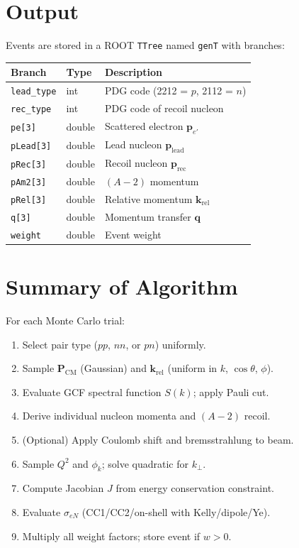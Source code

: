 \documentclass[11pt,a4paper]{article}
\newcommand{\vect}[1]{\bm{#1}}
\begin{document}
\section{Output}

Events are stored in a ROOT \texttt{TTree} named \texttt{genT} with branches:
\begin{center}
\begin{tabular}{lll}
\toprule
Branch & Type & Description \\
\midrule
\texttt{lead\_type} & int & PDG code (2212 = $p$, 2112 = $n$) \\
\texttt{rec\_type}  & int & PDG code of recoil nucleon \\
\texttt{pe[3]}      & double & Scattered electron $\vect{p}_{e'}$ \\
\texttt{pLead[3]}   & double & Lead nucleon $\vect{p}_{\text{lead}}$ \\
\texttt{pRec[3]}    & double & Recoil nucleon $\vect{p}_{\text{rec}}$ \\
\texttt{pAm2[3]}    & double & $(A{-}2)$ momentum \\
\texttt{pRel[3]}    & double & Relative momentum $\vect{k}_{\text{rel}}$ \\
\texttt{q[3]}       & double & Momentum transfer $\vect{q}$ \\
\texttt{weight}     & double & Event weight \\
\bottomrule
\end{tabular}
\end{center}

\section{Summary of Algorithm}

For each Monte Carlo trial:
\begin{enumerate}
  \item Select pair type ($pp$, $nn$, or $pn$) uniformly.
  \item Sample $\vect{P}_{\text{CM}}$ (Gaussian) and $\vect{k}_{\text{rel}}$
        (uniform in $k$, $\cos\theta$, $\phi$).
  \item Evaluate GCF spectral function $S(k)$; apply Pauli cut.
  \item Derive individual nucleon momenta and $(A{-}2)$ recoil.
  \item (Optional) Apply Coulomb shift and bremsstrahlung to beam.
  \item Sample $Q^{2}$ and $\phi_{k}$; solve quadratic for $k_{\perp}$.
  \item Compute Jacobian $J$ from energy conservation constraint.
  \item Evaluate $\sigma_{eN}$ (CC1/CC2/on-shell with Kelly/dipole/Ye).
  \item Multiply all weight factors; store event if $w > 0$.
\end{enumerate}
\end{document}
